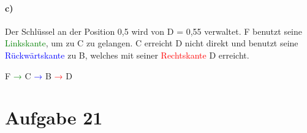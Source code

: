 \documentclass[10pt,a4paper]{article}
\begin{document}
\paragraph*{c)}
 Der Schlüssel an der Position 0,5 wird von D = 0,55 verwaltet. F benutzt seine \textcolor{green}{Linkskante}, um zu C zu gelangen. C erreicht D nicht direkt und benutzt seine \textcolor{blue}{Rückwärtskante} zu B, welches mit seiner \textcolor{red}{Rechtskante} D erreicht.
\begin{center}
F \textcolor{green}{→} C \textcolor{blue}{→} B \textcolor{red}{→} D
\end{center}

\section*{Aufgabe 21}
\end{document}
